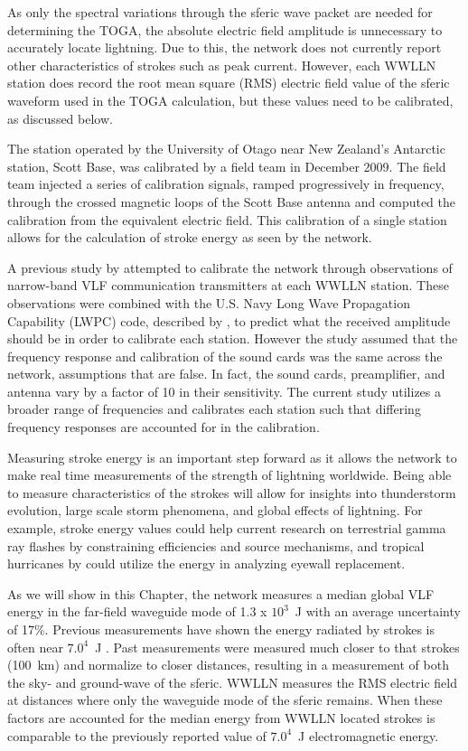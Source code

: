 As only the spectral variations through the sferic wave packet are needed for determining the TOGA, the absolute electric field amplitude is unnecessary to accurately locate lightning. Due to this, the network does not currently report other characteristics of strokes such as peak current.
However, each WWLLN station does record the root mean square (RMS) electric field value of the sferic waveform used in the TOGA calculation, but these values need to be calibrated, as discussed below.

The station operated by the University of Otago near New Zealand's Antarctic station, Scott Base, was calibrated by a field team in December 2009.
The field team injected a series of calibration signals, ramped progressively in frequency, through the crossed magnetic loops of the Scott Base antenna and computed the calibration from the equivalent electric field.
This calibration of a single station allows for the calculation of stroke energy as seen by the network.

A previous study by \citet{Rodger2006} attempted to calibrate the network through observations of narrow-band VLF communication transmitters at each WWLLN station.
These observations were combined with the U.S. Navy Long Wave Propagation Capability (LWPC) code, described by \citet{Ferguson1998}, to predict what the received amplitude should be in order to calibrate each station.
However the study assumed that the frequency response and calibration of the sound cards was the same across the network, assumptions that are false.
In fact, the sound cards, preamplifier, and antenna vary by a factor of 10 in their sensitivity. 
The current study utilizes a broader range of frequencies and calibrates each station such that differing frequency responses are accounted for in the calibration.

Measuring stroke energy is an important step forward as it allows the network to make real time measurements of the strength of lightning worldwide.
Being able to measure characteristics of the strokes will allow for insights into thunderstorm evolution, large scale storm phenomena, and global effects of lightning.
For example, stroke energy values could help current research on terrestrial gamma ray flashes by \citet{Briggs2011} constraining efficiencies and source mechanisms, and tropical hurricanes by \citet{Thomas2010d} could utilize the energy in analyzing eyewall replacement.

As we will show in this Chapter, the network measures a median global VLF energy in the far-field waveguide mode of 1.3 x $10^3$~J with an average uncertainty of 17\%.
Previous measurements have shown the energy radiated by strokes is often near $7.0^{4}$~J \citep{Taylor1963}.
Past measurements were measured much closer to that strokes (100~km) and normalize to closer distances, resulting in a measurement of both the sky- and ground-wave of the sferic.
WWLLN measures the RMS electric field at distances where only the waveguide mode of the sferic remains.
When these factors are accounted for the median energy from WWLLN located strokes is comparable to the previously reported value of $7.0^{4}$~J electromagnetic energy.

